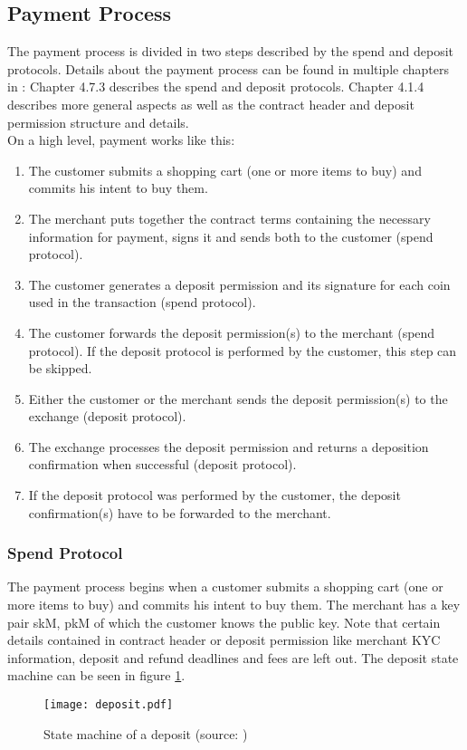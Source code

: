 \subsection{Payment Process}
The payment process is divided in two steps described by the spend and deposit protocols.
Details about the payment process can be found in multiple chapters in \cite{dold:the-gnu-taler-system}:
Chapter 4.7.3 describes the spend and deposit protocols.
Chapter 4.1.4 describes more general aspects as well as the contract header and deposit permission structure and details.
\\On a high level, payment works like this:
\begin{enumerate}
    \item The  customer submits a shopping cart (one or more items to buy) and commits his intent to buy them.
    \item The merchant puts together the contract terms containing the necessary information for payment, signs it and sends both to the customer (spend protocol).
    \item The customer generates a deposit permission and its signature for each coin used in the transaction (spend protocol).
    \item The customer forwards the deposit permission(s) to the merchant (spend protocol).
          If the deposit protocol is performed by the customer, this step can be skipped.
    \item Either the customer or the merchant sends the deposit permission(s) to the exchange (deposit protocol).
    \item The exchange processes the deposit permission and returns a deposition confirmation when successful (deposit protocol).
    \item If the deposit protocol was performed by the customer, the deposit confirmation(s) have to be forwarded to the merchant.
\end{enumerate}

\subsubsection{Spend Protocol}
The payment process begins when a customer submits a shopping cart (one or more items to buy) and commits his intent to buy them.
The merchant has a key pair skM, pkM of which the customer knows the public key.
Note that certain details contained in contract header or deposit permission like merchant \ac{KYC} information, deposit and refund deadlines and fees are left out.
The deposit state machine can be seen in figure \ref{fig:deposit:states}.
\begin{figure}[htp]
    \begin{center}
        \texttt{[image: deposit.pdf]}
    \end{center}
    \caption{State machine of a deposit (source: \cite{pic:deposit-state-machine})}
    \label{fig:deposit:states}
\end{figure}

